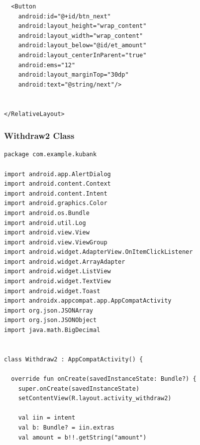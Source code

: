 \documentclass[11pt, a4paper]{article}
\begin{document}
\begin{appendices}
\begin{lstlisting}
  <Button
    android:id="@+id/btn_next"
    android:layout_height="wrap_content"
    android:layout_width="wrap_content"
    android:layout_below="@id/et_amount"
    android:layout_centerInParent="true"
    android:ems="12"
    android:layout_marginTop="30dp"
    android:text="@string/next"/>


</RelativeLayout>
\end{lstlisting}
\subsubsection{Withdraw2 Class}
\begin{lstlisting}
package com.example.kubank

import android.app.AlertDialog
import android.content.Context
import android.content.Intent
import android.graphics.Color
import android.os.Bundle
import android.util.Log
import android.view.View
import android.view.ViewGroup
import android.widget.AdapterView.OnItemClickListener
import android.widget.ArrayAdapter
import android.widget.ListView
import android.widget.TextView
import android.widget.Toast
import androidx.appcompat.app.AppCompatActivity
import org.json.JSONArray
import org.json.JSONObject
import java.math.BigDecimal


class Withdraw2 : AppCompatActivity() {

  override fun onCreate(savedInstanceState: Bundle?) {
    super.onCreate(savedInstanceState)
    setContentView(R.layout.activity_withdraw2)

    val iin = intent
    val b: Bundle? = iin.extras
    val amount = b!!.getString("amount")


\end{lstlisting}
\end{appendices}
\end{document}
